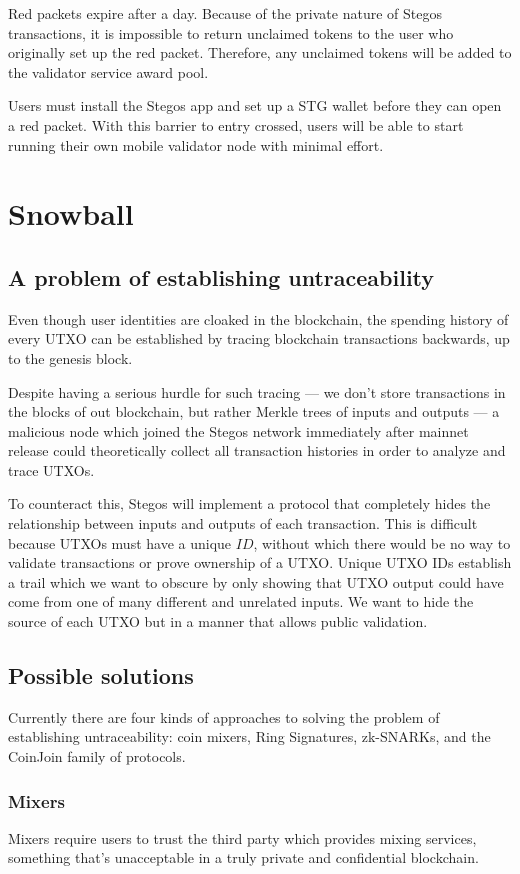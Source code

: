 \documentclass[8pt,fleqn,openany]{book}
\begin{document}
	Red packets expire after a day.  Because of the private nature of Stegos transactions, it is impossible to return unclaimed tokens to the user who originally set up the red packet. Therefore, any unclaimed tokens will be added to the validator service award pool.
	
	Users must install the Stegos app and set up a STG wallet before they can open a red packet. With this barrier to entry crossed, users will be able to start running their own mobile validator node with minimal effort.
	
	\section{Snowball}
	\subsection{A problem of establishing untraceability}
	Even though user identities are cloaked in the blockchain, the spending history of every UTXO can be established by tracing blockchain transactions backwards, up to the genesis block.
	
	Despite having a serious hurdle for such tracing — we don’t store transactions in the blocks of out blockchain, but rather Merkle trees of inputs and outputs — a malicious node which joined the Stegos network immediately after mainnet release could theoretically collect all transaction histories in order to analyze and trace UTXOs.
	
	To counteract this, Stegos will implement a protocol that completely hides the relationship between inputs and outputs of each transaction. This is difficult because UTXOs must have a unique $ID$, without which there would be no way to validate transactions or prove ownership of a UTXO. Unique UTXO IDs establish a trail which we want to obscure by only showing that UTXO output could have come from one of many different and unrelated inputs. We want to hide the source of each UTXO but in a manner that allows public validation.
	
	\subsection{Possible solutions}
	Currently there are four kinds of approaches to solving the problem of establishing untraceability: coin mixers, Ring Signatures, zk-SNARKs, and the CoinJoin family of protocols.
	
	\subsubsection{Mixers} Mixers require users to trust the third party which provides mixing services, something that’s unacceptable in a truly private and confidential blockchain.
	
\end{document}
